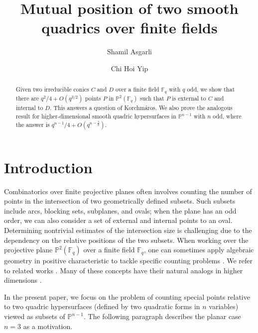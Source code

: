 \documentclass[12pt,reqno]{amsart}
\title{Mutual position of two smooth quadrics over finite fields}
\author{Shamil Asgarli}
\author{Chi Hoi Yip}
\theoremstyle{definition}
\newcommand{\F}{\mathbb{F}}
\begin{document}
\begin{abstract} 
Given two irreducible conics $C$ and $D$ over a finite field $\mathbb{F}_q$ with $q$ odd, we show that there are $q^2/4+O(q^{3/2})$ points $P$ in $\mathbb{P}^2(\mathbb{F}_q)$ such that $P$ is external to $C$ and internal to $D$. This answers a question of Korchm\'{a}ros. We also prove the analogous result for higher-dimensional smooth quadric hypersurfaces in $\mathbb{P}^{n-1}$ with $n$ odd, where the answer is $q^{n-1}/4+O(q^{n-\frac{3}{2}})$.
\end{abstract}

\maketitle



\section{Introduction}



Combinatorics over finite projective planes often involves counting the number of points in the intersection of two geometrically defined subsets. Such subsets include arcs, blocking sets, subplanes, and ovals; when the plane has an odd order, we can also consider a set of external and internal points to an oval. Determining nontrivial estimates of the intersection size is challenging due to the dependency on the relative positions of the two subsets. When working over the projective plane $\mathbb{P}^2(\F_q)$ over a finite field $\F_q$, one can sometimes apply algebraic geometry in positive characteristic to tackle specific counting problems \cite{H79, S97}. 
We refer to related works \cite{AFKL11, DD10, DDk09, PL23}. Many of these concepts have their natural analogs in higher dimensions \cite{AG14, AGY23, CP15}. 

In the present paper, we focus on the problem of counting special points relative to two quadric hypersurfaces (defined by two quadratic forms in $n$ variables) viewed as subsets of $\mathbb{P}^{n-1}$. The following paragraph describes the planar case $n=3$ as a motivation.
\end{document}
